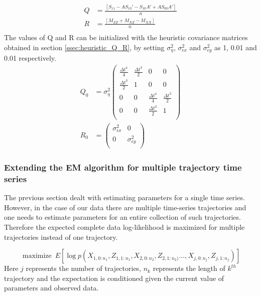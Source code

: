 \documentclass{article}
\DeclareMathOperator*{\maximize}{maximize}
\begin{document}
\begin{equation}
\begin{split}
 Q&=  \frac{[S_{11}-AS_{10}'-S_{10}A'+AS_{00}A']}{n}\\
 R&= \frac{[M_{ZZ}+M_{XZ}-M_{XX}]}{n}\\
\end{split}
\end{equation}
The values of Q and R can be initialized with the heuristic covariance matrices obtained in section \ref{ssec:heuristic_Q_R}, by setting $\sigma_\eta^2$, $\sigma_{\epsilon x}^2$ and $\sigma_{\epsilon y}^2$ as 1, 0.01 and 0.01 respectively.
\begin{equation}\label{eq:init2}
\begin{split}
     Q_0 &= \sigma_\eta^2\begin{pmatrix}
    \frac{\Delta t^4}{4} & \frac{\Delta t^3}{2} & 0 & 0\\
    \frac{\Delta t^3}{2} & 1 & 0 & 0\\
    0 & 0 & \frac{\Delta t^4}{4} & \frac{\Delta t^3}{2} \\
    0 & 0 & \frac{\Delta t^3}{2} & 1\\
    \end{pmatrix}\\
    R_0 &= \begin{pmatrix}
    \sigma_{\epsilon x}^2 & 0\\
     0 & \sigma_{\epsilon y}^2\\
    \end{pmatrix}
\end{split}
\end{equation}

\subsubsection{Extending the EM algorithm for multiple trajectory time series}
The previous section dealt with estimating parameters for a single time series. However, in the case of our data there are multiple time-series trajectories and one needs to estimate parameters for an entire collection of such trajectories. Therefore the expected complete data log-likelihood is maximized for multiple trajectories instead of one trajectory.

$$\maximize \ E[\log p(X_{1,0:n_1},Z_{1,1:n_1},X_{2,0:n_2},Z_{2,1:n_2)}...,X_{j,0:n_j},Z_{j,1:n_j})] $$
Here $j$ represents the number of trajectories, $n_k$ represents the length of $k^{th}$ trajectory and the expectation is conditioned given the current value of parameters and observed data. 
\end{document}
